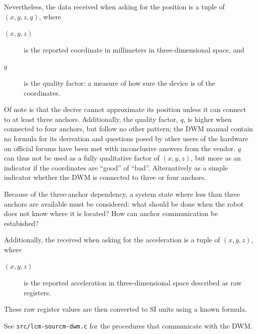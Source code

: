Nevertheless, the data received when asking for the position is a tuple of
$(x, y, z, q)$, where
\begin{description}
\item[$(x, y, z)$] is the reported coordinate in millimeters in three-dimensional space, and
\item[$q$] is the quality factor: a measure of how sure the device is of the coordinates.
\end{description}

Of note is that the decive cannot approximate its position unless it can connect to at least three anchors.
Additionally, the quality factor, $q$, is higher when connected to four anchors, but follow no other pattern;
the DWM manual contain no formula for its derivation and questions posed by other users of the hardware on official forums have been met with inconclusive answers from the vendor.
$q$ can thus not be used as a fully qualitative factor of $(x, y, z)$, but more as an indicator if the coordinates are ``good'' of ``bad''.
Alternatively as a simple indicator whether the DWM is connected to three or four anchors.

Because of the three-anchor dependency, a system state where less than three anchors are available must be considered:
what should be done when the robot does not know where it is located?
How can anchor communication be estabished?

Additionally, the received when asking for the acceleration is a tuple of $(x, y, z)$, where
\begin{description}
\item[$(x, y, z)$] is the reported acceleration in three-dimensional space described as raw registers.
\end{description}
These raw register values are then converted to SI units using a known formula.

See \verb|src/lcm-sourcm-dwm.c| for the procedures that communicate with the DWM.



